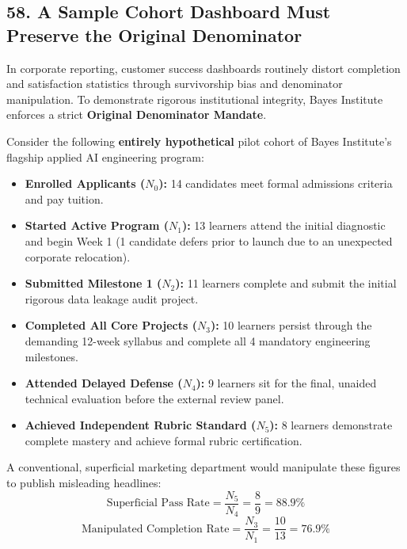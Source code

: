 \subsection*{58. A Sample Cohort Dashboard Must Preserve the Original Denominator}

In corporate reporting, customer success dashboards routinely distort completion and satisfaction statistics through survivorship bias and denominator manipulation. To demonstrate rigorous institutional integrity, Bayes Institute enforces a strict \textbf{Original Denominator Mandate}.

Consider the following \textbf{entirely hypothetical} pilot cohort of Bayes Institute's flagship applied AI engineering program:
\begin{itemize}[leftmargin=*]
\item \textbf{Enrolled Applicants ($N_0$):} 14 candidates meet formal admissions criteria and pay tuition.
\item \textbf{Started Active Program ($N_1$):} 13 learners attend the initial diagnostic and begin Week 1 (1 candidate defers prior to launch due to an unexpected corporate relocation).
\item \textbf{Submitted Milestone 1 ($N_2$):} 11 learners complete and submit the initial rigorous data leakage audit project.
\item \textbf{Completed All Core Projects ($N_3$):} 10 learners persist through the demanding 12-week syllabus and complete all 4 mandatory engineering milestones.
\item \textbf{Attended Delayed Defense ($N_4$):} 9 learners sit for the final, unaided technical evaluation before the external review panel.
\item \textbf{Achieved Independent Rubric Standard ($N_5$):} 8 learners demonstrate complete mastery and achieve formal rubric certification.
\end{itemize}

A conventional, superficial marketing department would manipulate these figures to publish misleading headlines:
\begin{equation}
\text{Superficial Pass Rate} = \frac{N_5}{N_4} = \frac{8}{9} = 88.9\%
\end{equation}
\begin{equation}
\text{Manipulated Completion Rate} = \frac{N_3}{N_1} = \frac{10}{13} = 76.9\%
\end{equation}

